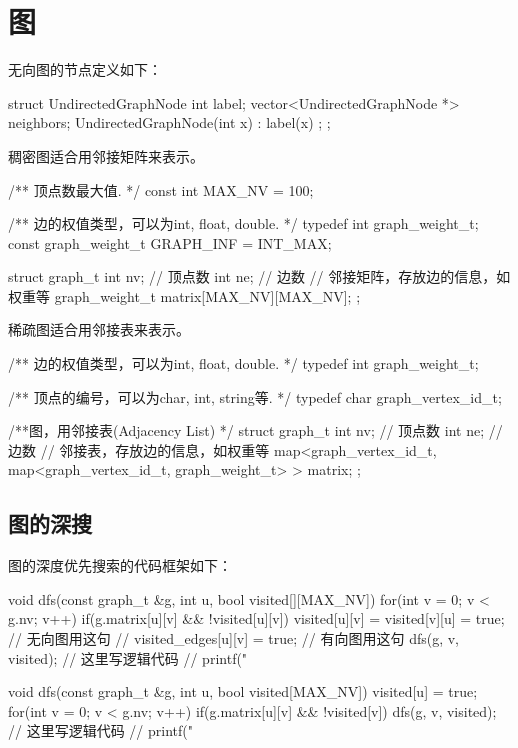 \chapter{图}
无向图的节点定义如下：
\begin{Codex}
	struct UndirectedGraphNode {
		int label;
		vector<UndirectedGraphNode *> neighbors;
		UndirectedGraphNode(int x) : label(x) {};
	};
\end{Codex}

稠密图适合用邻接矩阵来表示。
\begin{Codex}[label=am_graph.cpp]
    /** 顶点数最大值. */
    const int MAX_NV = 100;

    /** 边的权值类型，可以为int, float, double. */
    typedef int graph_weight_t;
    const graph_weight_t GRAPH_INF = INT_MAX;

    struct graph_t {
        int nv; // 顶点数
        int ne; // 边数
        // 邻接矩阵，存放边的信息，如权重等
        graph_weight_t matrix[MAX_NV][MAX_NV];
    };
\end{Codex}

稀疏图适合用邻接表来表示。
\begin{Codex}[label=al_graph.cpp]
    /** 边的权值类型，可以为int, float, double. */
    typedef int graph_weight_t;

    /** 顶点的编号，可以为char, int, string等. */
    typedef char graph_vertex_id_t;

    /**图，用邻接表(Adjacency List) */
    struct graph_t {
        int nv; // 顶点数
        int ne; // 边数
        // 邻接表，存放边的信息，如权重等
        map<graph_vertex_id_t, map<graph_vertex_id_t, graph_weight_t> > matrix;
    };
\end{Codex}


\section{图的深搜} %

图的深度优先搜索的代码框架如下：

\begin{Codex}[label=graph_dfs.cpp]
    void dfs(const graph_t &g, int u, bool visited[][MAX_NV]) {
        for(int v = 0;  v < g.nv; v++) if(g.matrix[u][v] && !visited[u][v]) {
            visited[u][v] = visited[v][u] = true; // 无向图用这句
            // visited_edges[u][v] = true; // 有向图用这句
            dfs(g, v, visited);
            // 这里写逻辑代码
            // printf("%
        }
    }

    void dfs(const graph_t &g, int u, bool visited[MAX_NV]) {
        visited[u] = true;
        for(int v = 0;  v < g.nv; v++) if(g.matrix[u][v] && !visited[v]) {
            dfs(g, v, visited);
            // 这里写逻辑代码
            // printf("%
        }
    }
\end{Codex}


